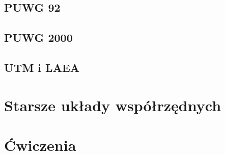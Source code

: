 \documentclass[a4paper,11pt, onecolumn, openany]{memoir}
\begin{document}
			\subsection{PUWG 92}
			\subsection{PUWG 2000}
			\subsection{UTM i LAEA}
		\section{Starsze układy współrzędnych}
		\section{Ćwiczenia}
\end{document}
